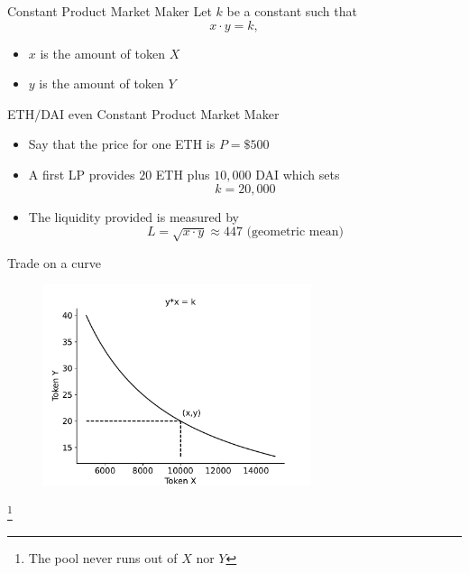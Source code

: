 \documentclass{beamer}
\newcommand\blfootnote[1]{%
  \begingroup
  \renewcommand\thefootnote{}\footnote{#1}%
  \addtocounter{footnote}{-1}%
  \endgroup
}
\begin{document}
\begin{frame}{Constant Product Market Maker}
\footnotesize
Let $k$ be a constant such that 
$$
x\cdot y =k,
$$
\begin{itemize}
  \item $x$ is the amount of token $X$
  \item $y$ is the amount of token $Y$
\end{itemize}
    \begin{tcolorbox}[enhanced,drop shadow, title=Example]
    \footnotesize
    ETH$/$DAI even Constant Product Market Maker
    \begin{itemize}
      \item Say that the price for one ETH is $P=\$500$
      \item A first LP provides $20$ ETH plus $10,000$ DAI which sets 
      $$k = 20,000$$
      \item The liquidity provided is measured by 
      $$
      L = \sqrt{x\cdot y} \approx 447\text{ (geometric mean)}
      $$
    \end{itemize}
\end{tcolorbox}

\end{frame}
\begin{frame}{Trade on a curve}
\begin{figure}[!ht]
    \includegraphics[width = 0.7\textwidth]{../../Figures/AMM_initial.pdf}
    \centering
    \label{fig:AMM_initial}
\end{figure}
\blfootnote{\tiny The pool never runs out of $X$ nor $Y$}
\end{frame}
\end{document}
